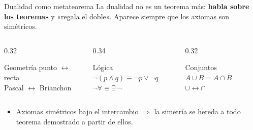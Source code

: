 \documentclass[aspectratio=169]{beamer}
\begin{document}
\begin{frame}{Dualidad como metateorema}
  La dualidad no es un teorema más: \textbf{habla sobre los teoremas} y
  «regala el doble». Aparece siempre que los axiomas son simétricos.
  \vspace{0.3cm}
  \begin{columns}[T]
    \begin{column}{0.32\textwidth}
      \begin{block}{Geometría}
        punto $\leftrightarrow$ recta\\[2pt]
        Pascal $\leftrightarrow$ Brianchon
      \end{block}
    \end{column}
    \begin{column}{0.34\textwidth}
      \begin{block}{Lógica}
        $\neg(p\wedge q)\equiv\neg p\vee\neg q$\\[2pt]
        $\neg\forall \equiv \exists\,\neg$
      \end{block}
    \end{column}
    \begin{column}{0.32\textwidth}
      \begin{block}{Conjuntos}
        $\overline{A\cup B}=\bar A\cap\bar B$\\[2pt]
        $\cup \leftrightarrow \cap$
      \end{block}
    \end{column}
  \end{columns}
  \vspace{0.3cm}
  \begin{itemize}
    \item Axiomas simétricos bajo el intercambio $\Rightarrow$ la simetría se
          \alert{hereda} a todo teorema demostrado a partir de ellos.
  \end{itemize}
\end{frame}
\end{document}
